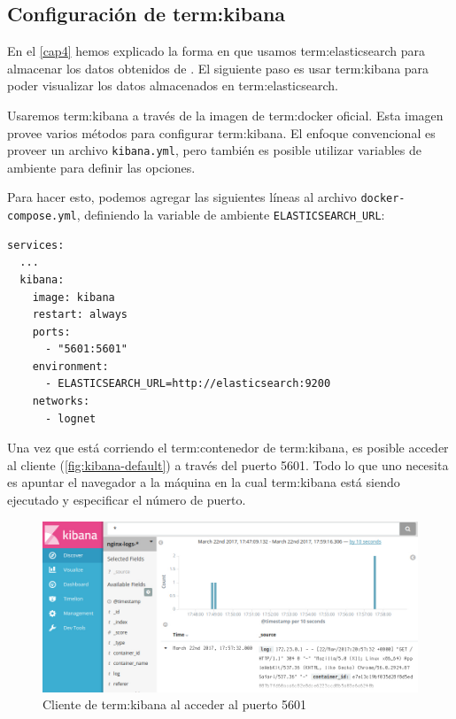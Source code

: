 \subsection{Configuración de \gls{term:kibana}}
\label{configuracion-de-kibana}

En el \autoref{cap4} hemos explicado la forma en que usamos \gls{term:elasticsearch} para
almacenar los datos obtenidos de . El siguiente paso es usar
\gls{term:kibana} para poder visualizar los datos almacenados en
\gls{term:elasticsearch}.

Usaremos \gls{term:kibana} a través de la imagen de \gls{term:docker} oficial.
Esta imagen provee varios métodos para configurar \gls{term:kibana}. El enfoque
convencional es proveer un archivo \texttt{kibana.yml}, pero también es
posible utilizar variables de ambiente para definir las opciones.

Para hacer esto, podemos agregar las siguientes líneas al archivo
\texttt{docker-compose.yml}, definiendo la variable de ambiente
\lstinline{ELASTICSEARCH_URL}:

\begin{lstlisting}
services:
  ...
  kibana:
    image: kibana
    restart: always
    ports:
      - "5601:5601"
    environment:
      - ELASTICSEARCH_URL=http://elasticsearch:9200
    networks:
      - lognet
\end{lstlisting}

Una vez que está corriendo el \gls{term:contenedor} de \gls{term:kibana}, es posible acceder al
cliente  (\autoref{fig:kibana-default}) a través
del puerto 5601. Todo lo que uno necesita es apuntar el navegador  a la
máquina en la cual \gls{term:kibana} está siendo ejecutado y especificar el
número de puerto.

\begin{figure}
  \includegraphics[width=\linewidth]{src/images/05-capitulo-5/kibanadefault.jpg}
  \caption{Cliente de \gls{term:kibana} al acceder al puerto 5601}
  \label{fig:kibana-default}
\end{figure}

